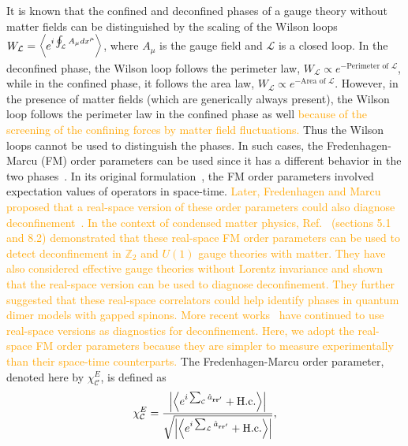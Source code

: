 \documentclass[twocolumn,superscriptaddress,amsmath,amssymb,aps,prx,nofootinbib]{revtex4-2}
\newcommand{\addtext}[1]{\textcolor{orange}{#1}}
\begin{document}
It is known that the confined and deconfined phases of a gauge theory without matter fields can be distinguished by the scaling of the Wilson loops $W_\mathcal{L} = \expval{ e^{i \oint_\mathcal{L} A_\mu dx^\mu} }$, where $A_\mu$ is the gauge field and $\mathcal{L}$ is a closed loop. In the deconfined phase, the Wilson loop follows the perimeter law, $W_{\mathcal{L}} \propto e^{-\text{Perimeter of }\mathcal{L}}$, while in the confined phase, it follows the area law, $W_{\mathcal{L}} \propto e^{-\text{Area of }\mathcal{L}}$. However, in the presence of matter fields (which are generically always present), the Wilson loop follows the perimeter law in the confined phase as well \cite{fradkin2013field,shankar2017quantum} \addtext{because of the screening of the confining forces by matter field fluctuations.} Thus the Wilson loops cannot be used to distinguish  the phases. In such cases, the Fredenhagen-Marcu (FM) order parameters can be used since it has a different behavior in the two phases~\cite{fredenhagen1983charged,fredenhagen1986,fredenhagen1988dual,marcu1986uses,bricmont1983order,gregor2011diagnosing,verresen2021,semeghini2021}. 
In its original formulation~\cite{fredenhagen1983charged}, the FM order parameters involved expectation values of operators in space-time.
\addtext{Later, Fredenhagen and Marcu proposed that a real-space version of these order parameters could also diagnose deconfinement~\cite{fredenhagen1988dual}. In the context of condensed matter physics, Ref.~\cite{gregor2011diagnosing} (sections 5.1 and 8.2) demonstrated that these real-space FM order parameters can be used to detect deconfinement in $\mathbb{Z}_2$ and $U(1)$ gauge theories with matter.
They have also considered effective gauge theories without Lorentz invariance and shown that the real-space version can be used to diagnose deconfinement.
They further suggested that these real-space correlators could help identify phases in quantum dimer models with gapped spinons. More recent works~\cite{verresen2021,xu2024critical} have continued to use real-space versions as diagnostics for deconfinement. Here, we adopt the real-space FM order parameters because they are simpler to measure experimentally than their space-time counterparts.}
The Fredenhagen-Marcu order parameter, denoted here by $\chi^E_{\mathcal{C}}$, is defined as
\begin{equation} \label{eq:FM_e}
  \chi_{\mathcal{C}}^E = \frac{\abs{ \expval{ e^{i\sum_\mathcal{C} \hat{a}_{\vb{r}\vb{r}'}  } +\text{H.c.} } } }{\sqrt{ \abs{ \expval{ e^{i \sum_{\mathcal{L}} \hat{a}_{\vb{r} \vb{r}'} } + \text{H.c.} }  }}},
\end{equation}
\end{document}

